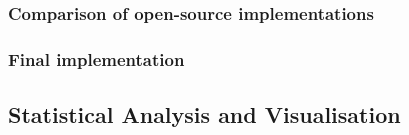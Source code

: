 \documentclass{report}
\begin{document}

\subsubsection{Comparison of open-source implementations}




\subsubsection{Final implementation}


\subsection{Statistical Analysis and Visualisation}




\end{document}
